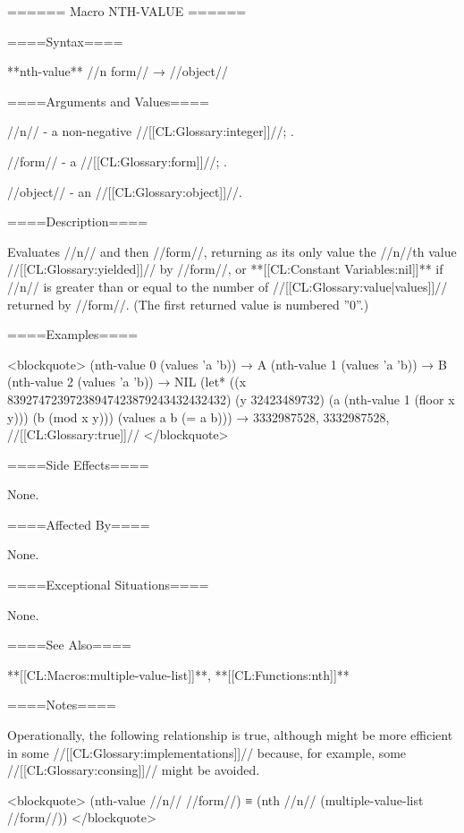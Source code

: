 ====== Macro NTH-VALUE ======

====Syntax====

**nth-value** //n form// → //object//

====Arguments and Values====

//n// - a non-negative //[[CL:Glossary:integer]]//; \eval.

//form// - a //[[CL:Glossary:form]]//; \evalspecial.

//object// - an //[[CL:Glossary:object]]//.

====Description====

Evaluates //n// and then //form//, returning as its only value the //n//th value //[[CL:Glossary:yielded]]// by //form//, or **[[CL:Constant Variables:nil]]** if //n// is greater than or equal to the number of //[[CL:Glossary:value|values]]// returned by //form//. (The first returned value is numbered ''0''.)

====Examples====

<blockquote> (nth-value 0 (values 'a 'b)) → A (nth-value 1 (values 'a 'b)) → B (nth-value 2 (values 'a 'b)) → NIL (let* ((x 83927472397238947423879243432432432) (y 32423489732) (a (nth-value 1 (floor x y))) (b (mod x y))) (values a b (= a b))) → 3332987528, 3332987528, //[[CL:Glossary:true]]// </blockquote>

====Side Effects====

None.

====Affected By====

None.

====Exceptional Situations====

None.

====See Also====

**[[CL:Macros:multiple-value-list]]**, **[[CL:Functions:nth]]**

====Notes====

Operationally, the following relationship is true, although  might be more efficient in some //[[CL:Glossary:implementations]]// because, for example, some //[[CL:Glossary:consing]]// might be avoided.

<blockquote> (nth-value //n// //form//) ≡ (nth //n// (multiple-value-list //form//)) </blockquote>

